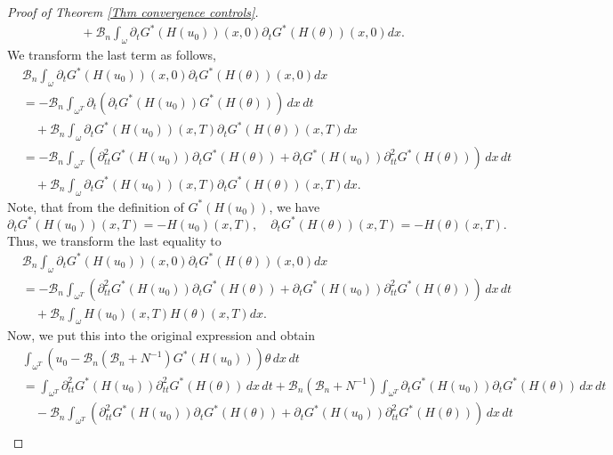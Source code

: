 \documentclass[reqno]{amsart}
\begin{document}
\begin{proof}[Proof of Theorem \ref{Thm convergence controls}]
\begin{align*}
&\quad + \mathcal{B}_n\int _{\omega }\partial _{t}G^{\ast
}(H(u_0))(x,0)\partial _{t}G^{\ast }(H(\theta))(x,0){dx}.
\end{align*}
We transform the last term as follows,
\begin{align*}
&\mathcal{B}_n\int _{\omega }\partial _{t}G^{\ast
}(H(u_0))(x,0)\partial _{t}G^{\ast }(H(\theta))(x,0){dx} \\
&=-\mathcal{B}_n\int _{\omega ^{T}}\partial _{t}(\partial
_{t}G^{\ast }(H(u_0))G^{\ast }(H(\theta)))\,dx\,dt \\
&\quad + \mathcal{B}_n\int _{\omega }\partial _{t}G^{\ast
}(H(u_0))(x,T)\partial _{t}G^{\ast }(H(\theta))(x,T){dx} \\
&=-\mathcal{B}_n\int _{\omega ^{T}}(\partial _{tt}^2G^{\ast
}(H(u_0))\partial _{t}G^{\ast }(H(\theta)) + \partial _{t} G^{\ast
}(H(u_0))\partial _{tt}^2G^{\ast }(H(\theta)))\,dx\,dt \\
&\quad + \mathcal{B}_n\int _{\omega }\partial _{t}G^{\ast
}(H(u_0))(x,T)\partial _{t}G^{\ast }(H(\theta))(x,T){dx}.
\end{align*}
Note, that from the definition of $G^{\ast }(H(u_0))$, we have
\[
\partial _{t}G^{\ast }(H(u_0))(x,T) = -H(u_0)(x,T),\quad
\partial_{t}G^{\ast}(H(\theta))(x, T) = - H(\theta)(x, T).
\]%
Thus, we transform the last equality to
\begin{align*}
&\mathcal{B}_n\int _{\omega }\partial _{t}G^{\ast
}(H(u_0))(x,0)\partial _{t}G^{\ast }(H(\theta))(x,0){dx} \\
&= -\mathcal{B}_n\int _{\omega ^{T}}(\partial _{tt}^2G^{\ast
}(H(u_0))\partial _{t}G^{\ast }(H(\theta)) + \partial _{t} G^{\ast
}(H(u_0))\partial _{tt}^2G^{\ast }(H(\theta)))\,dx\,dt \\
&\quad + \mathcal{B}_n\int _{\omega }H(u_0)(x,T) H(\theta)(x,T){dx}.
\end{align*}
Now, we put this into the original expression and obtain
\begin{align*}
&\int _{\omega ^{T}}(u_0-\mathcal{B}_n(\mathcal{B}
_n+N^{-1})G^{\ast }(H(u_0)))\theta \,dx\,dt \\
&=\int _{\omega ^{T}}\partial _{tt}^2G^{\ast }(H(u_0)) \partial
_{tt}^2G^{\ast }(H(\theta))\,dx\,dt+\mathcal{B}_n(\mathcal{B}%
_n+N^{-1})\int _{\omega ^{T}}\partial _{t}G^{\ast }(H(u_0))
\partial _{t}G^{\ast }(H(\theta))\,dx\,dt \\
&\quad - \mathcal{B}_n\int _{\omega ^{T}}(\partial _{tt}^2G^{\ast
}(H(u_0))\partial _{t}G^{\ast }(H(\theta)) + \partial _{t} G^{\ast
}(H(u_0))\partial _{tt}^2G^{\ast }(H(\theta)))\,dx\,dt \\

\end{align*}
\end{proof}
\end{document}
